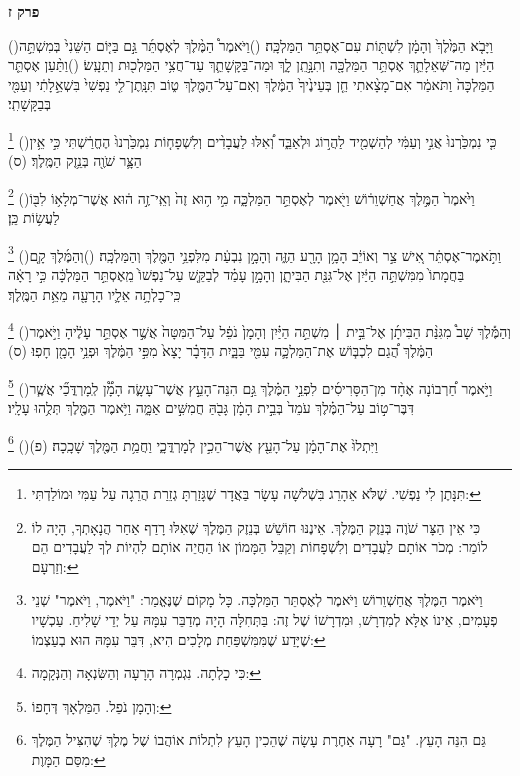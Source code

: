 \documentclass[12pt, openany]{book}
\newcommand{\sethebfont}{
\fontsize{10.5pt}{13.1pt} \selectfont
}
\newcommand{\twocol}[1]{
	{\sethebfont \begin{multicols}{2}
			#1
	\end{multicols}}	
}
\newcommand{\chapname}{}
\newcommand{\newchap}[1]{
	\addcontentsline{toc}{chapter}{#1}
	\renewcommand{\chapname}{#1}
		\begin{center}
			\textbf{%
\fontsize{16pt}{16pt}\selectfont
				#1}
		\end{center}
}
\newcommand{\footnotecomment}[1]{
	\renewcommand\thefootnote{}
	\footnote{#1}}
\newcommand{\commenta}[1]{\footnotecomment{#1}\hspace{0em}}
\newcommand{\vsnum}[1]{(\hebrewnumeral{#1})\space}
\begin{document}
\newchap{פרק ז}
\twocol{\vsnum{1}וַיָּבֹ֤א הַמֶּ֙לֶךְ֙ וְהָמָ֔ן לִשְׁתּ֖וֹת עִם־אֶסְתֵּ֥ר הַמַּלְכָּֽה׃
\vsnum{2}וַיֹּאמֶר֩ הַמֶּ֨לֶךְ לְאֶסְתֵּ֜ר גַּ֣ם בַּיּ֤וֹם הַשֵּׁנִי֙ בְּמִשְׁתֵּ֣ה הַיַּ֔יִן מַה־שְּׁאֵלָתֵ֛ךְ אֶסְתֵּ֥ר הַמַּלְכָּ֖ה וְתִנָּ֣תֵֽן לָ֑ךְ וּמַה־בַּקָּשָׁתֵ֛ךְ עַד־חֲצִ֥י הַמַּלְכ֖וּת וְתֵעָֽשׂ׃
\vsnum{3}וַתַּ֨עַן אֶסְתֵּ֤ר הַמַּלְכָּה֙ וַתֹּאמַ֔ר אִם־מָצָ֨אתִי חֵ֤ן בְּעֵינֶ֙יךָ֙ הַמֶּ֔לֶךְ וְאִם־עַל־הַמֶּ֖לֶךְ ט֑וֹב תִּנָּֽתֶן־לִ֤י נַפְשִׁי֙ בִּשְׁאֵ֣לָתִ֔י וְעַמִּ֖י בְּבַקָּשָׁתִֽי׃%
\commenta{תִּנָּתֶן לִי נַפְשִׁי. שֶׁלֹּא אֵהָרֵג בִּשְׁלשָׁה עָשָׂר בַּאֲדָר שֶׁגָּזַרְתָּ גְזֵרַת הֲרֵגָה עַל עַמִּי וּמוֹלַדְתִּי:}%
\vsnum{4}כִּ֤י נִמְכַּ֙רְנוּ֙ אֲנִ֣י וְעַמִּ֔י לְהַשְׁמִ֖יד לַהֲר֣וֹג וּלְאַבֵּ֑ד וְ֠אִלּוּ לַעֲבָדִ֨ים וְלִשְׁפָח֤וֹת נִמְכַּ֙רְנוּ֙ הֶחֱרַ֔שְׁתִּי כִּ֣י אֵ֥ין הַצָּ֛ר שֹׁוֶ֖ה בְּנֵ֥זֶק הַמֶּֽלֶךְ׃ (ס)%
\commenta{כִּי אֵין הַצָּר שֹׁוֶה בְּנֵזֶק הַמֶּלֶךְ. אֵינֶנּוּ חוֹשֵׁשׁ בְּנֵזֶק הַמֶּלֶךְ שֶׁאִלּוּ רָדַף אַחַר הֲנָאָתְךָ, הָיָה לוֹ לוֹמַר: מְכֹר אוֹתָם לַעֲבָדִים וְלִשְׁפָחוֹת וְקַבֵּל הַמָּמוֹן אוֹ הַחֲיֵה אוֹתָם לִהְיוֹת לְךָ לַעֲבָדִים הֵם וְזַרְעָם: }%
\vsnum{5}וַיֹּ֙אמֶר֙ הַמֶּ֣לֶךְ אֲחַשְׁוֵר֔וֹשׁ וַיֹּ֖אמֶר לְאֶסְתֵּ֣ר הַמַּלְכָּ֑ה מִ֣י ה֥וּא זֶה֙ וְאֵֽי־זֶ֣ה ה֔וּא אֲשֶׁר־מְלָא֥וֹ לִבּ֖וֹ לַעֲשׂ֥וֹת כֵּֽן׃%
\commenta{וַיֹּאמֶר הַמֶּלֶךְ אֲחַשְׁוֵרוֹשׁ וַיֹּאמֶר לְאֶסְתֵּר הַמַּלְכָּה. כָּל מָקוֹם שֶׁנֶּאֱמַר: "וַיֹּאמֶר, וַיֹּאמֶר" שְׁנֵי פְעָמִים, אֵינוֹ אֶלָּא לְמִדְרָשׁ, וּמִדְרָשׁוֹ שֶׁל זֶה: בַּתְּחִלָּה הָיָה מְדַבֵּר עִמָּהּ עַל יְדֵי שָׁלִיחַ. עַכְשָׁיו שֶׁיָּדַע שֶׁמִּמִּשְׁפַּחַת מְלָכִים הִיא, דִּבֵּר עִמָּהּ הוּא בְעַצְמוֹ: }%
\vsnum{6}וַתֹּ֣אמֶר־אֶסְתֵּ֔ר אִ֚ישׁ צַ֣ר וְאוֹיֵ֔ב הָמָ֥ן הָרָ֖ע הַזֶּ֑ה וְהָמָ֣ן נִבְעַ֔ת מִלִּפְנֵ֥י הַמֶּ֖לֶךְ וְהַמַּלְכָּֽה׃
\vsnum{7}וְהַמֶּ֜לֶךְ קָ֤ם בַּחֲמָתוֹ֙ מִמִּשְׁתֵּ֣ה הַיַּ֔יִן אֶל־גִּנַּ֖ת הַבִּיתָ֑ן וְהָמָ֣ן עָמַ֗ד לְבַקֵּ֤שׁ עַל־נַפְשׁוֹ֙ מֵֽאֶסְתֵּ֣ר הַמַּלְכָּ֔ה כִּ֣י רָאָ֔ה כִּֽי־כָלְתָ֥ה אֵלָ֛יו הָרָעָ֖ה מֵאֵ֥ת הַמֶּֽלֶךְ׃%
\commenta{כִּי כָלְתָה. נִגְמְרָה הָרָעָה וְהַשִּׂנְאָה וְהַנְּקָמָה:}%
\vsnum{8}וְהַמֶּ֡לֶךְ שָׁב֩ מִגִּנַּ֨ת הַבִּיתָ֜ן אֶל־בֵּ֣ית ׀ מִשְׁתֵּ֣ה הַיַּ֗יִן וְהָמָן֙ נֹפֵ֔ל עַל־הַמִּטָּה֙ אֲשֶׁ֣ר אֶסְתֵּ֣ר עָלֶ֔יהָ וַיֹּ֣אמֶר הַמֶּ֔לֶךְ הֲ֠גַם לִכְבּ֧וֹשׁ אֶת־הַמַּלְכָּ֛ה עִמִּ֖י בַּבָּ֑יִת הַדָּבָ֗ר יָצָא֙ מִפִּ֣י הַמֶּ֔לֶךְ וּפְנֵ֥י הָמָ֖ן חָפֽוּ׃ (ס)%
\commenta{וְהָמָן נֹפֵל. הַמַּלְאָךְ דְּחָפוֹ:}%
\vsnum{9}וַיֹּ֣אמֶר חַ֠רְבוֹנָה אֶחָ֨ד מִן־הַסָּרִיסִ֜ים לִפְנֵ֣י הַמֶּ֗לֶךְ גַּ֣ם הִנֵּה־הָעֵ֣ץ אֲשֶׁר־עָשָׂ֪ה הָמָ֟ן לְֽמָרְדֳּכַ֞י אֲשֶׁ֧ר דִּבֶּר־ט֣וֹב עַל־הַמֶּ֗לֶךְ עֹמֵד֙ בְּבֵ֣ית הָמָ֔ן גָּבֹ֖הַּ חֲמִשִּׁ֣ים אַמָּ֑ה וַיֹּ֥אמֶר הַמֶּ֖לֶךְ תְּלֻ֥הוּ עָלָֽיו׃%
\commenta{גַּם הִנֵּה הָעֵץ. "גַּם" רָעָה אַחֶרֶת עָשָׂה שֶׁהֵכִין הָעֵץ לִתְלוֹת אוֹהֲבוֹ שֶׁל מֶלֶךְ שֶׁהִצִּיל הַמֶּלֶךְ מִסַּם הַמָּוֶת: }%
\vsnum{10}וַיִּתְלוּ֙ אֶת־הָמָ֔ן עַל־הָעֵ֖ץ אֲשֶׁר־הֵכִ֣ין לְמָרְדֳּכָ֑י וַחֲמַ֥ת הַמֶּ֖לֶךְ שָׁכָֽכָה׃ (פ)
\clearpage}
\end{document}
